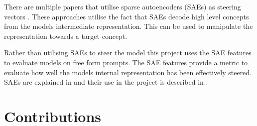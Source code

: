 There are multiple papers that utilise sparse autoencoders (SAEs) as steering vectors \citep{sae-improved, sae-steering, icl-sae}.
These approaches utilise the fact that SAEs decode high level concepts from the models intermediate representation.
This can be used to manipulate the representation towards a target concept.

Rather than utilising SAEs to steer the model this project uses the SAE features to evaluate models on free form prompts.
The SAE features provide a metric to evaluate how well the models internal representation has been effectively steered.
SAEs are explained in  and their use in the project is described in .

\section{Contributions}
\label{sec:contributions}

